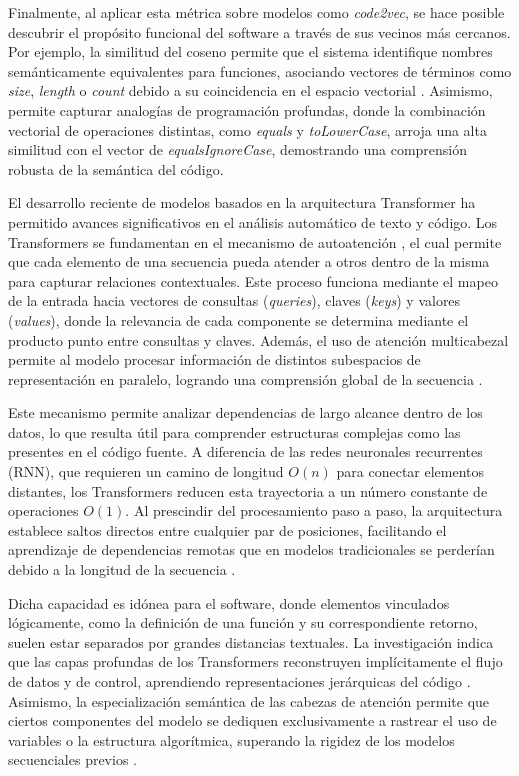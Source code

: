 Finalmente, al aplicar esta métrica sobre modelos como \textit{code2vec}, se hace posible descubrir el propósito funcional del software a través de sus vecinos más cercanos. Por ejemplo, la similitud del coseno permite que el sistema identifique nombres semánticamente equivalentes para funciones, asociando vectores de términos como \textit{size}, \textit{length} o \textit{count} debido a su coincidencia en el espacio vectorial \cite{Alon2018Code2Vec}. Asimismo, permite capturar analogías de programación profundas, donde la combinación vectorial de operaciones distintas, como \textit{equals} y \textit{toLowerCase}, arroja una alta similitud con el vector de \textit{equalsIgnoreCase}, demostrando una comprensión robusta de la semántica del código.

El desarrollo reciente de modelos basados en la arquitectura Transformer ha permitido avances significativos en el análisis automático de texto y código. Los Transformers se fundamentan en el mecanismo de autoatención \cite{Vaswani2017Attention}, el cual permite que cada elemento de una secuencia pueda atender a otros dentro de la misma para capturar relaciones contextuales. Este proceso funciona mediante el mapeo de la entrada hacia vectores de consultas (\textit{queries}), claves (\textit{keys}) y valores (\textit{values}), donde la relevancia de cada componente se determina mediante el producto punto entre consultas y claves. Además, el uso de atención multicabezal permite al modelo procesar información de distintos subespacios de representación en paralelo, logrando una comprensión global de la secuencia \cite{Vaswani2017Attention}.

Este mecanismo permite analizar dependencias de largo alcance dentro de los datos, lo que resulta útil para comprender estructuras complejas como las presentes en el código fuente. A diferencia de las redes neuronales recurrentes (RNN), que requieren un camino de longitud $O(n)$ para conectar elementos distantes, los Transformers reducen esta trayectoria a un número constante de operaciones $O(1)$. Al prescindir del procesamiento paso a paso, la arquitectura establece saltos directos entre cualquier par de posiciones, facilitando el aprendizaje de dependencias remotas que en modelos tradicionales se perderían debido a la longitud de la secuencia \cite{Vaswani2017Attention}.

Dicha capacidad es idónea para el software, donde elementos vinculados lógicamente, como la definición de una función y su correspondiente retorno, suelen estar separados por grandes distancias textuales. La investigación indica que las capas profundas de los Transformers reconstruyen implícitamente el flujo de datos y de control, aprendiendo representaciones jerárquicas del código \cite{Zhang2022TransformerCode}. Asimismo, la especialización semántica de las cabezas de atención permite que ciertos componentes del modelo se dediquen exclusivamente a rastrear el uso de variables o la estructura algorítmica, superando la rigidez de los modelos secuenciales previos \cite{Zhang2022TransformerCode}.

